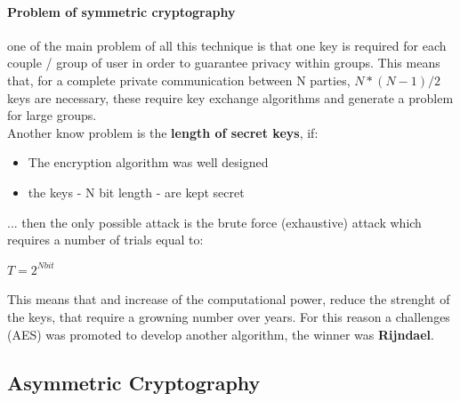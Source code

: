 \documentclass[12pt]{article}
\begin{document}
\paragraph{Problem of symmetric cryptography} one of the main problem of all this technique is that one key is required for each couple / group of user in order to guarantee privacy within groups. This means that, for a complete private communication between N parties, \textbf{$N*(N-1)/2$} keys are necessary, these require key exchange algorithms and generate a problem for large groups.\\
Another know problem is the \textbf{length of secret keys}, if:
\begin{itemize}
  \item The encryption algorithm was well designed
  \item the keys - N bit length - are kept secret
\end{itemize}
... then the only possible attack is the brute force (exhaustive) attack which requires a number of trials equal to:
\begin{center}
  $T = 2^{Nbit}$
\end{center}
This means that and increase of the computational power, reduce the strenght of the keys, that require a growning number over years. For this reason a challenges (AES) was promoted to develop another algorithm, the winner was \textbf{Rijndael}.

\subsection{Asymmetric Cryptography}
\end{document}
